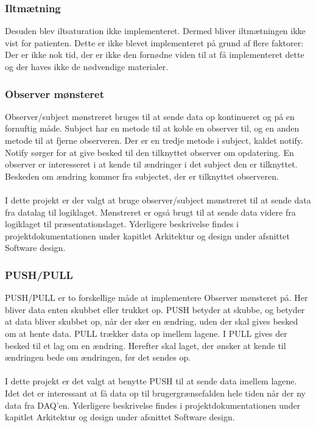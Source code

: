 \subsubsection{Iltmætning}
Desuden blev iltsaturation ikke implementeret. Dermed bliver iltmætningen ikke vist for patienten. Dette er ikke blevet implementeret på grund af flere faktorer: Der er ikke nok tid, der er ikke den fornødne viden til at få implementeret dette og der haves ikke de nødvendige materialer.






\subsubsection{Observer mønsteret}
Observer/subject mønstreret bruges til at sende data op kontinueret og på en fornuftig måde. Subject har en metode til at koble en observer til, og en anden metode til at fjerne observeren. Der er en tredje metode i subject, kaldet notify. Notify sørger for at give besked til den tilknyttet observer om opdatering. En observer er interesseret i at kende til ændringer i det subject den er tilknyttet. Beskeden om ændring kommer fra subjectet, der er tilknyttet observeren. \\
\\
I dette projekt er der valgt at bruge observer/subject mønstreret til at sende data fra datalag til logiklaget. Mønstreret er også brugt til at sende data videre fra logiklaget til præsentationslaget. Yderligere beskrivelse findes i projektdokumentationen under kapitlet Arkitektur og design under afsnittet Software design. 
\subsubsection{PUSH/PULL}
PUSH/PULL er to forskellige måde at implementere Observer mønsteret på. Her bliver data enten skubbet eller trukket op. PUSH betyder at skubbe, og betyder at data bliver skubbet op, når der sker en ændring, uden der skal gives besked om at hente data. PULL trækker data op imellem lagene. I PULL gives der besked til et lag om en ændring. Herefter skal laget, der ønsker at kende til ændringen bede om ændringen, før det sendes op.\\
\\
I dette projekt er det valgt at benytte PUSH til at sende data imellem lagene. Idet det er interessant at få data op til brugergrænsefalden hele tiden når der ny data fra DAQ’en. Yderligere beskrivelse findes i projektdokumentationen under kapitlet Arkitektur og design under afsnittet Software design. 
